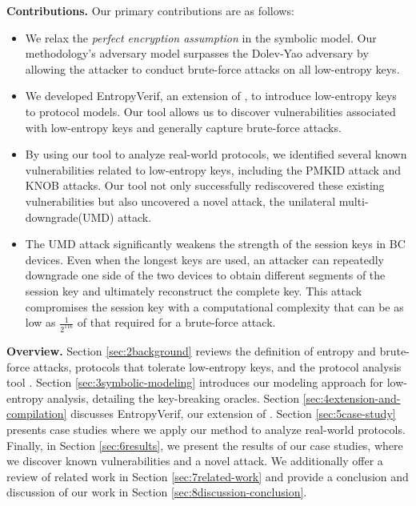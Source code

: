 \documentclass[../main.tex]{subfiles}  %
\begin{document}
\noindent\textbf{Contributions.}
Our primary contributions are as follows:
\begin{itemize}[leftmargin=*]
    \item We relax the \emph{perfect encryption assumption} in the symbolic model. 
    Our methodology's adversary model surpasses the Dolev-Yao adversary by allowing the attacker to conduct brute-force attacks on all low-entropy keys.
    \item We developed EntropyVerif, an extension of \Tamarin{}, to introduce low-entropy keys to protocol models. 
    Our tool allows us to discover vulnerabilities associated with low-entropy keys and generally capture brute-force attacks.
    \item By using our tool to analyze real-world protocols, we identified several known vulnerabilities related to low-entropy keys, including the PMKID attack and KNOB attacks.
    Our tool not only successfully rediscovered these existing vulnerabilities but also uncovered a novel attack, the unilateral multi-downgrade(UMD) attack.
    \item The UMD attack significantly weakens the strength of the session keys in BC devices. 
    Even when the longest keys are used, an attacker can repeatedly downgrade one side of the two devices to obtain different segments of the session key and ultimately reconstruct the complete key.
    This attack compromises the session key with a computational complexity that can be as low as $\frac{1}{2^{116}}$ of that required for a brute-force attack.
\end{itemize}

\noindent\textbf{Overview.} 
Section \ref{sec:2background} reviews the definition of entropy and brute-force attacks, protocols that tolerate low-entropy keys, and the protocol analysis tool \Tamarin{}.
Section \ref{sec:3symbolic-modeling} introduces our modeling approach for low-entropy analysis, detailing the key-breaking oracles. 
Section \ref{sec:4extension-and-compilation} discusses EntropyVerif, our extension of \Tamarin{}.
Section \ref{sec:5case-study} presents case studies where we apply our method to analyze real-world protocols. 
Finally, in Section \ref{sec:6results}, we present the results of our case studies, where we discover known vulnerabilities and a novel attack. 
We additionally offer a review of related work in Section \ref{sec:7related-work} and provide a conclusion and discussion of our work in Section \ref{sec:8discussion-conclusion}.
\end{document}

